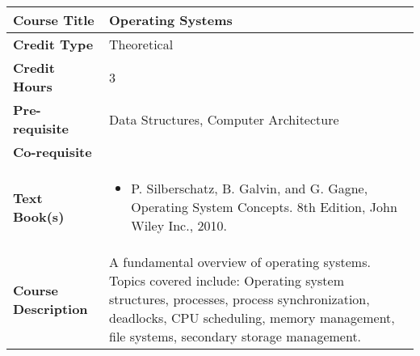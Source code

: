 \documentclass[11pt]{article}
\begin{document}
\begin{table}[h!]
\begin{tabular}{|l|l|}
\hline
\textbf{Course Title}       &  Operating Systems \\ \hline
\textbf{Credit Type}        &   Theoretical \\ \hline
\textbf{Credit Hours}       & 3 \\ \hline
\textbf{Pre-requisite}       &  Data Structures, Computer Architecture \\ \hline
\textbf{Co-requisite}       &  \\ \hline
\textbf{Text Book(s)}       & \begin{minipage}{.70\textwidth}
\begin{itemize} \itemsep-0.4em
	\vspace{3mm}
	\item P. Silberschatz, B. Galvin, and G. Gagne, Operating System Concepts. 8th Edition, John Wiley Inc., 2010.
	\vspace{3mm}
\end{itemize}
\end{minipage}\\ \hline
\textbf{Course Description} & \begin{minipage}{.70\textwidth}
\vspace{3mm}
A fundamental overview of operating systems. Topics covered include: Operating system structures, processes, process synchronization, deadlocks, CPU scheduling, memory management, file systems, secondary storage management.
\vspace{3mm}
\end{minipage} \\ \hline
\end{tabular}
\end{table}
\end{document}
